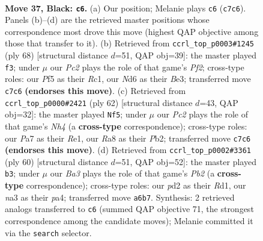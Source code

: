 \documentclass[11pt]{article}
\begin{document}
\clearpage

\begin{figure}[p]\centering
\begin{subfigure}{0.46\textwidth}\centering
\resizebox{\linewidth}{!}{%
\newchessgame
\chessboard[
  setfen={r7/p1pp4/bp1n2k1/5p1p/BPP2P2/N7/P2P3P/R3K3 b - - 4 37},
  showmover=false,
  pgfstyle=straightmove, color=movearrow, markmove={c7-c6}
]}
\caption{}
\end{subfigure}\hfill
\begin{subfigure}{0.46\textwidth}\centering
\resizebox{\linewidth}{!}{%
\newchessgame
\chessboard[
  setfen={r4bk1/2p3p1/4pn1p/4p3/1Pp1P3/2P1B1NP/5PPK/2R5 w - - 0 35},
  showmover=false,
  pgfstyle=straightmove, color=movearrow, markmove={f2-f3}
]}
\caption{}
\end{subfigure}
\\[4pt]
\begin{subfigure}{0.46\textwidth}\centering
\resizebox{\linewidth}{!}{%
\newchessgame
\chessboard[
  setfen={3r3k/7p/pp6/2np4/5bpN/8/PP3PPP/4RBK1 w - - 0 32},
  showmover=false,
  pgfstyle=straightmove, color=movearrow, markmove={h4-f5}
]}
\caption{}
\end{subfigure}\hfill
\begin{subfigure}{0.46\textwidth}\centering
\resizebox{\linewidth}{!}{%
\newchessgame
\chessboard[
  setfen={2r5/4kp2/5npp/1pp1N3/p3P3/5P1P/PP2K1P1/3R4 w - - 0 31},
  showmover=false,
  pgfstyle=straightmove, color=movearrow, markmove={b2-b3}
]}
\caption{}
\end{subfigure}
\caption{\textbf{Move 37, Black: \texttt{c6}.} (a) Our position; Melanie plays \texttt{c6} (\texttt{c7c6}). Panels (b)--(d) are the retrieved master positions whose correspondence most drove this move (highest QAP objective among those that transfer to it). (b) Retrieved from \texttt{ccrl\_top\_p0003\#1245} (ply 68) [structural distance $d$=51, QAP obj=39]: the master played \texttt{f3}; under $\mu$ our \emph{Pc2} plays the role of that game's \emph{Pf2}; cross-type roles: our \emph{P}f5 as their \emph{R}c1, our \emph{N}d6 as their \emph{B}e3; transferred move \texttt{c7c6} \textbf{(endorses this move)}. (c) Retrieved from \texttt{ccrl\_top\_p0000\#2421} (ply 62) [structural distance $d$=43, QAP obj=32]: the master played \texttt{Nf5}; under $\mu$ our \emph{Pc2} plays the role of that game's \emph{Nh4} (a \textbf{cross-type} correspondence); cross-type roles: our \emph{P}a7 as their \emph{R}e1, our \emph{R}a8 as their \emph{P}b2; transferred move \texttt{c7c6} \textbf{(endorses this move)}. (d) Retrieved from \texttt{ccrl\_top\_p0002\#3361} (ply 60) [structural distance $d$=51, QAP obj=52]: the master played \texttt{b3}; under $\mu$ our \emph{Ba3} plays the role of that game's \emph{Pb2} (a \textbf{cross-type} correspondence); cross-type roles: our \emph{p}d2 as their \emph{R}d1, our \emph{n}a3 as their \emph{p}a4; transferred move \texttt{a6b7}. Synthesis: 2 retrieved analogs transferred to \texttt{c6} (summed QAP objective 71, the strongest correspondence among the candidate moves); Melanie committed it via the \texttt{search} selector.}
\label{fig:thought-m73}
\end{figure}
\end{document}
